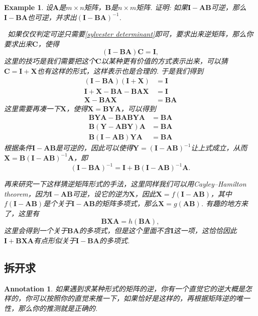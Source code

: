\documentclass{article}
\newtheorem{example}[theorem]{Example}
\newtheorem{annotation}[theorem]{Annotation}
\newcommand{\hints}{{\color{blue} \text{hints}}}
\newcommand{\mbf}[1]{\bm{#1}}
\begin{document}
\begin{example}
\rm 设$\mbf{A}$是$m \times n$矩阵，$\mbf{B}$是$n \times m$矩阵. 证明: 如果$\mbf{I}-\mbf{A}\mbf{B}$可逆，那么$\mbf{I}-\mbf{B}\mbf{A}$也可逆，并求出$(\mbf{I}-\mbf{B}\mbf{A})^{-1}$. 

\hints\ 如果仅仅判定可逆只需要\ref{sylvester determinant}即可，要求出来逆矩阵，那么你要求出来$\mbf{C}$，使得
$$
(\mbf{I}-\mbf{B}\mbf{A})\mbf{C} = \mbf{I},
$$
这里的技巧是我们需要把这个$\mbf{C}$以某种更有价值的方式表示出来，可以猜$\mbf{C}  =  \mbf{I} + \mbf{X}$也有这样的形式，这样表示也是合理的. 于是我们得到
$$
\begin{array}{rl}
(\mbf{I}-\mbf{B}\mbf{A})(\mbf{I} + \mbf{X}) &= \mbf{I} \\
\mbf{I} + \mbf{X} -\mbf{BA} - \mbf{BAX} &= \mbf{I} \\
\mbf{X} - \mbf{BAX} &= \mbf{BA} 
\end{array}
$$
这里需要再凑一下$\mbf{X}$，使得$\mbf{X} = \mbf{B}\mbf{Y}\mbf{A}$，可以得到
$$
\begin{array}{rl}
\mbf{B}\mbf{Y}\mbf{A} - \mbf{BA}\mbf{B}\mbf{Y}\mbf{A} &= \mbf{BA} \\
\mbf{B}(\mbf{Y}-\mbf{ABY})\mbf{A} &= \mbf{BA} \\
\mbf{B}(\mbf{I}-\mbf{AB})\mbf{Y}\mbf{A} &= \mbf{BA}
\end{array}
$$
根据条件$\mbf{I}-\mbf{AB}$是可逆的，因此可以使得$\mbf{Y} = (\mbf{I}-\mbf{AB})^{-1}$让上式成立，从而$\mbf{X} = \mbf{B}(\mbf{I}-\mbf{AB})^{-1}\mbf{A}$，即
$$
(\mbf{I}-\mbf{B}\mbf{A})^{-1} = \mbf{I} + \mbf{B}(\mbf{I}-\mbf{AB})^{-1}\mbf{A}.
$$

再来研究一下这样猜逆矩阵形式的手法，这里同样我们可以用Cayley–Hamilton theorem，因为$\mbf{I}-\mbf{A}\mbf{B}$可逆，设它的逆为$\mbf{X}$，因此$\mbf{X} = f(\mbf{I}-\mbf{A}\mbf{B})$，其中$f(\mbf{I}-\mbf{A}\mbf{B})$是个关于$\mbf{I}-\mbf{A}\mbf{B}$的矩阵多项式，那么$\mbf{X} = g(\mbf{A}\mbf{B})$. 有趣的地方来了，这里有
$$
\mbf{B}\mbf{X}\mbf{A} = h(\mbf{BA}),
$$
这里会得到一个关于$\mbf{BA}$的多项式，但是这个里面不含$\mbf{I}$这一项，这恰恰因此$\mbf{I} +  \mbf{B}\mbf{X}\mbf{A}$有点形似关于$\mbf{I}-\mbf{BA}$的多项式. 
\end{example}

\subsection{拆开求}

\begin{annotation}
\rm 如果遇到求某种形式的矩阵的逆，你有一个直觉它的逆大概是怎样的，你可以按照你的直觉来推一下，如果恰好是这样的，再根据矩阵逆的唯一性，那么你的推测就是正确的. 
\end{annotation}
\end{document}
